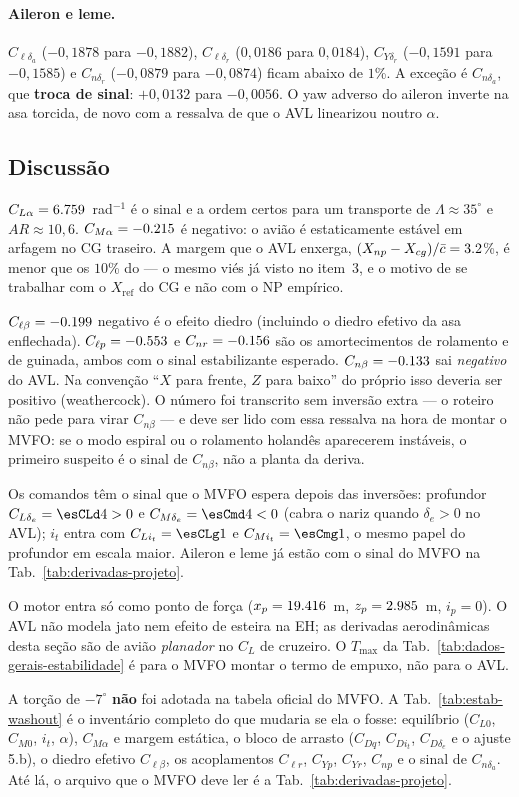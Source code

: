 \paragraph{Aileron e leme.}
$C_{\ell\delta_a}$ ($-0{,}1878$ para $-0{,}1882$), $C_{\ell\delta_r}$
($0{,}0186$ para $0{,}0184$), $C_{Y\delta_r}$ ($-0{,}1591$ para
$-0{,}1585$) e $C_{n\delta_r}$ ($-0{,}0879$ para $-0{,}0874$) ficam abaixo
de $1$\%. A exceção é $C_{n\delta_a}$, que \textbf{troca de sinal}:
$+0{,}0132$ para $-0{,}0056$. O yaw adverso do aileron inverte na asa
torcida, de novo com a ressalva de que o AVL linearizou noutro $\alpha$.

\subsection{Discussão}

$C_{L\alpha} = 6.759$~rad$^{-1}$ é o sinal e a ordem certos para um transporte
de $\Lambda \approx 35^\circ$ e $AR \approx 10{,}6$. $C_{M\alpha} = -0.215$ é
negativo: o avião é estaticamente estável em arfagem no CG traseiro. A margem
que o AVL enxerga,
$(X_{np}-X_{cg})/\bar{c} = 3.2$\%, é menor que os $10$\% do
 --- o mesmo viés já visto no item~3, e o motivo de se
trabalhar com o $X_{\mathrm{ref}}$ do CG e não com o NP empírico.

$C_{\ell\beta} = -0.199$ negativo é o efeito diedro (incluindo o diedro
efetivo da asa enflechada). $C_{\ell p} = -0.553$ e $C_{nr} = -0.156$ são os
amortecimentos de rolamento e de guinada, ambos com o sinal estabilizante
esperado. $C_{n\beta} = -0.133$ sai \emph{negativo} do AVL. Na convenção
``$X$ para frente, $Z$ para baixo'' do próprio  isso deveria ser
positivo (weathercock). O número foi transcrito sem inversão extra --- o
roteiro não pede para virar $C_{n\beta}$ --- e deve ser lido com essa ressalva
na hora de montar o MVFO: se o modo espiral ou o rolamento holandês
aparecerem instáveis, o primeiro suspeito é o sinal de $C_{n\beta}$, não a
planta da deriva.

Os comandos têm o sinal que o MVFO espera depois das inversões: profundor
$C_{L\delta_e} = \esCLd4 > 0$ e $C_{M\delta_e} = \esCmd4 < 0$ (cabra o nariz
quando $\delta_e > 0$ no AVL); $i_t$ entra com
$C_{Li_t} = \esCLg1$ e $C_{Mi_t} = \esCmg1$, o mesmo papel do profundor em
escala maior. Aileron e leme já estão com o sinal do MVFO na
Tab.~\ref{tab:derivadas-projeto}.

O motor entra só como ponto de força ($x_p = 19.416$~m, $z_p = 2.985$~m,
$i_p = 0$). O AVL não modela jato nem efeito de esteira na EH; as derivadas
aerodinâmicas desta seção são de avião \emph{planador} no $C_L$ de cruzeiro.
O $T_{\max}$ da Tab.~\ref{tab:dados-gerais-estabilidade} é para o MVFO
montar o termo de empuxo, não para o AVL.

A torção de $-7^\circ$ \textbf{não} foi adotada na tabela oficial do
MVFO. A Tab.~\ref{tab:estab-washout} é o inventário completo do que mudaria
se ela o fosse: equilíbrio ($C_{L0}$, $C_{M0}$, $i_t$, $\alpha$),
$C_{M\alpha}$ e margem estática, o bloco de arrasto ($C_{Dq}$, $C_{Di_t}$,
$C_{D\delta_e}$ e o ajuste 5.b), o diedro efetivo $C_{\ell\beta}$, os
acoplamentos $C_{\ell r}$, $C_{Yp}$, $C_{Yr}$, $C_{np}$ e o sinal de
$C_{n\delta_a}$. Até lá, o arquivo que o MVFO deve ler é a
Tab.~\ref{tab:derivadas-projeto}.
